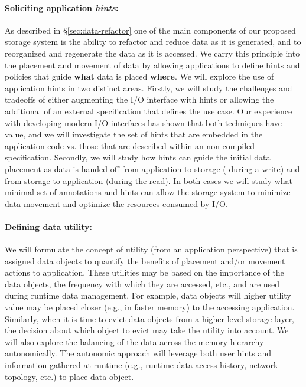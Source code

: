 \paragraph{Soliciting application {\em hints}:}
As described in \S\ref{sec:data-refactor} one of the main components of our
proposed storage system is the ability to refactor and reduce data as it is
generated, and to reorganized and regenerate the data as it is accessed. We
carry this principle into the placement and movement of data by allowing
applications to define hints and policies that guide \textbf{what} data is
placed \textbf{where}. We will explore the use of application hints in two
distinct areas. Firstly, we will study the challenges and tradeoffs of either
augmenting the I/O interface with hints or allowing the additional of an
external specification that defines the use case. Our experience with
developing modern I/O interfaces has shown that both techniques have value,
and we will investigate the set of hints that are embedded in the
application code vs. those that are described within an non-compiled
specification. Secondly, we will study how hints can guide the initial data
placement as data is handed off from application to storage ( during a
write) and from storage to application (during the read). In both cases we
will study what minimal set of annotations and hints can allow the storage
system to minimize data movement and optimize the resources consumed by I/O. 

\paragraph{Defining data utility:} We will formulate the concept of utility (from an
application perspective) that is assigned data objects to quantify the
benefits of placement and/or movement actions to application. These
utilities may be based on the importance of the data objects, the frequency
with which they are accessed, etc., and are used during runtime data
management. For example, data objects will higher utility value may be
placed closer (e.g., in faster memory) to the accessing application.
Similarly, when it is time to evict data objects from a higher level storage
layer, the decision about which object to evict may take the utility into
account. We will also explore the balancing of the data across the memory
hierarchy autonomically. The autonomic approach will leverage both user
hints and information gathered at runtime (e.g., runtime data access
history, network topology, etc.) to place data object.

